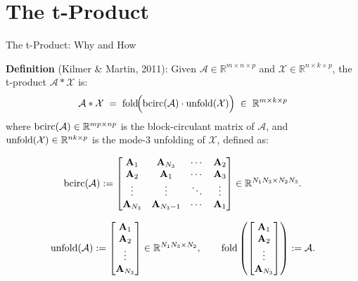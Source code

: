 \documentclass[aspectratio=169]{beamer}
\newcommand{\mcalA}{\mathcal{A}}
\newcommand{\mcalX}{\mathcal{X}}
\def\mbf{\mathbf}
\def\bcirc{{\rm bcirc}}
\def\unfold{{\rm unfold}}
\def\fold{{\rm fold}}
\def\mcala{\mathcal A}
\def\mbbr{\mathbb R}
\newcommand{\bem}{\begin{bmatrix}}\newcommand{\eem}{\end{bmatrix}}
\begin{document}
\section{The t-Product}
\begin{frame}{The t-Product: Why and How}

  \textbf{Definition} (Kilmer \& Martin, 2011): Given $\mcalA \in \mbbr^{m \times n \times p}$
  and $\mcalX \in \mbbr^{n \times k \times p}$, the t-product $\mcalA * \mcalX$ is:
  \[
    \mcalA * \mcalX
    \;=\;
    \fold\!\Big(\bcirc(\mcalA) \cdot \unfold(\mcalX)\Big)
    \;\in\; \mbbr^{m \times k \times p}
  \]
  where $\bcirc(\mcalA) \in \mbbr^{mp \times np}$ is the block-circulant matrix of $\mcalA$, and $\unfold(\mcalX) \in \mbbr^{nk \times p}$ is the mode-3 unfolding of $\mcalX$, defined as:

\end{frame}
\begin{frame}
  $$
    \bcirc(\mcala):=\bem\mbf A_1 &\mbf A_{N_3} & \cdots & \mbf A_2\\ \mbf A_2 & \mbf A_1 & \cdots &\mbf A_3\\ \vdots &\vdots & \ddots &\vdots\\ \mbf A_{N_3}& \mbf A_{N_3-1}& \cdots &\mbf A_1\eem\in\mbbr^{N_1N_3\times N_2N_3}.
$$

$$
\unfold(\mcala):=\bem\mbf A_1\\ \mbf A_2\\ \vdots\\ \mbf A_{N_3}\eem\in\mbbr^{N_1N_3\times N_2},\qquad \fold\left(\bem\mbf A_1\\ \mbf A_2\\ \vdots\\ \mbf A_{N_3}\eem\right):=\mcala.
$$ 
\end{frame}
\end{document}
